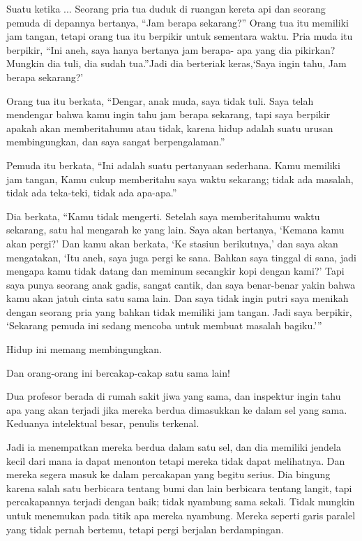 Suatu ketika ... Seorang pria tua duduk di ruangan kereta api dan seorang pemuda di depannya bertanya, “Jam berapa sekarang?” Orang tua itu memiliki jam tangan, tetapi orang tua itu berpikir untuk sementara waktu. Pria muda itu berpikir, “Ini aneh, saya hanya bertanya jam berapa- apa yang dia pikirkan? Mungkin dia tuli, dia sudah tua.”Jadi dia berteriak keras,‘Saya ingin tahu, Jam berapa sekarang?’

Orang tua itu berkata, “Dengar, anak muda, saya tidak tuli. Saya telah mendengar bahwa kamu ingin tahu jam berapa sekarang, tapi saya berpikir apakah akan memberitahumu atau tidak, karena hidup adalah suatu urusan membingungkan, dan saya sangat berpengalaman.”

Pemuda itu berkata, “Ini adalah suatu pertanyaan sederhana. Kamu memiliki jam tangan, Kamu cukup memberitahu saya waktu sekarang; tidak ada masalah, tidak ada teka-teki, tidak ada apa-apa.”

Dia berkata, “Kamu tidak mengerti. Setelah saya memberitahumu waktu sekarang, satu hal mengarah ke yang lain. Saya akan bertanya, ‘Kemana kamu akan pergi?’ Dan kamu akan berkata, ‘Ke stasiun berikutnya,’ dan saya akan mengatakan, ‘Itu aneh, saya juga pergi ke sana. Bahkan saya tinggal di sana, jadi mengapa kamu tidak datang dan meminum secangkir kopi dengan kami?’ Tapi saya punya seorang anak gadis, sangat cantik, dan saya benar-benar yakin bahwa kamu akan jatuh cinta satu sama lain. Dan saya tidak ingin putri saya menikah dengan seorang pria yang bahkan tidak memiliki jam tangan. Jadi saya berpikir, ‘Sekarang pemuda ini sedang mencoba untuk membuat masalah bagiku.’”

Hidup ini memang membingungkan.

Dan orang-orang ini bercakap-cakap satu sama lain!

Dua profesor berada di rumah sakit jiwa yang sama, dan inspektur ingin tahu apa yang akan terjadi jika mereka berdua dimasukkan ke dalam sel yang sama. Keduanya intelektual besar, penulis terkenal.

Jadi ia menempatkan mereka berdua dalam satu sel, dan dia memiliki jendela kecil dari mana ia dapat menonton tetapi mereka tidak dapat melihatnya. Dan mereka segera masuk ke dalam percakapan yang begitu serius. Dia bingung karena salah satu berbicara tentang bumi dan lain berbicara tentang langit, tapi percakapannya terjadi dengan baik; tidak nyambung sama sekali. Tidak mungkin untuk menemukan pada titik apa mereka nyambung. Mereka seperti garis paralel yang tidak pernah bertemu, tetapi pergi berjalan berdampingan.

